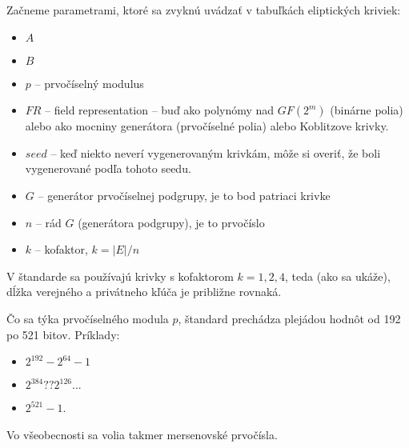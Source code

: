 Začneme parametrami, ktoré sa zvyknú uvádzať v tabuľkách eliptických
kriviek:
\begin{itemize}
    \item $A$
    \item $B$
    \item $p$ -- prvočíselný modulus
    \item $FR$ -- field representation -- buď ako polynómy nad
        $GF(2^m)$ (binárne polia)
        alebo ako mocniny generátora (prvočíselné polia)
        alebo Koblitzove krivky.
    \item $seed$ -- keď niekto neverí vygenerovaným krivkám, môže si
        overiť, že boli vygenerované podľa tohoto seedu.
    \item $G$ -- generátor prvočíselnej podgrupy, je to bod patriaci krivke
    \item $n$ -- rád $G$ (generátora podgrupy), je to prvočíslo
    \item $k$ -- kofaktor, $k=|E| / n$
\end{itemize}
\begin{poznamka}
    V štandarde sa používajú krivky s kofaktorom $k=1,2,4$, teda (ako
    sa ukáže), dĺžka verejného a privátneho kľúča je približne
    rovnaká.
\end{poznamka}

Čo sa týka prvočíselného modula $p$, štandard prechádza plejádou
hodnôt od 192 po 521 bitov. 
Príklady:
\begin{itemize}
    \item $2^{192} - 2^{64} - 1$ 
    \item $2^{384} ?? 2^{126} ...$ \fixme{}
    \item $2^{521} - 1$.
\end{itemize}
Vo všeobecnosti sa volia takmer mersenovské prvočísla.

